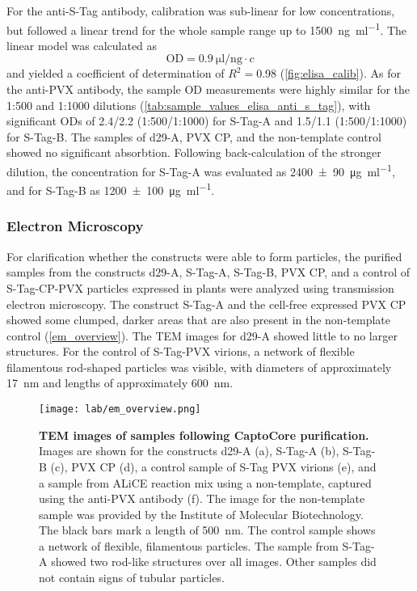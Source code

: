 For the anti-S-Tag antibody, calibration was sub-linear for low concentrations, but followed a linear trend for the whole sample range up to \SI{1500}{\nano\gram\per\milli\litre}. The linear model was calculated as 
\begin{equation}
\text{OD} = \SI{0.9}{\micro\litre\per\nano\gram} \cdot c
\end{equation}
and yielded a coefficient of determination of $R^2 = 0.98$ (\autoref{fig:elisa_calib}). As for the anti-PVX antibody, the sample OD measurements were highly similar for the 1:500 and 1:1000 dilutions (\autoref{tab:sample_values_elisa_anti_s_tag}), with significant ODs of 2.4/2.2 (1:500/1:1000)  for S-Tag-A and 1.5/1.1 (1:500/1:1000) for S-Tag-B. The samples of d29-A, PVX CP, and the non-template control showed no significant absorbtion. Following back-calculation of the stronger dilution, the concentration for S-Tag-A was evaluated as \SI{2400\pm 90}{\micro\gram\per\milli\litre}, and for S-Tag-B as \SI{1200\pm 100}{\micro\gram\per\milli\litre}.

\subsubsection{Electron Microscopy}
For clarification whether the constructs were able to form particles, the purified samples from the constructs d29-A, S-Tag-A, S-Tag-B, PVX CP, and a control of S-Tag-CP-PVX particles expressed in plants were analyzed using transmission electron microscopy. The construct S-Tag-A and the cell-free expressed PVX CP showed some clumped, darker areas that are also present in the non-template control (\autoref{em_overview}). The TEM images for d29-A showed little to no larger structures. For the control of S-Tag-PVX virions, a network of flexible filamentous rod-shaped particles was visible, with diameters of approximately \SI{17}{\nano\meter} and lengths of approximately \SI{600}{\nano\meter}. 

\begin{figure}
\texttt{[image: lab/em\_overview.png]}
\caption{\textbf{TEM images of samples following CaptoCore purification. } Images are shown for the constructs d29-A (a), S-Tag-A (b), S-Tag-B (c), PVX CP (d), a control sample of S-Tag PVX virions (e), and a sample from ALiCE reaction mix using a non-template, captured using the anti-PVX antibody (f). The image for the non-template sample was provided by the Institute of Molecular Biotechnology. The black bars mark a length of \SI{500}{\nano\meter}. The control sample shows a network of flexible, filamentous particles. The sample from S-Tag-A showed two rod-like structures over all images. Other samples did not contain signs of tubular particles. }
\label{fig:em_overview}
\end{figure}

